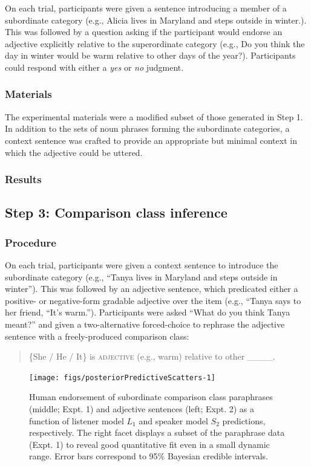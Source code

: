 \documentclass[doc]{apa6}
\begin{document}
On each trial, participants were given a sentence introducing a member of a subordinate category (e.g., Alicia lives in Maryland and steps outside in winter.). 
This was followed by a question asking if the participant would endorse an adjective explicitly relative to the superordinate category (e.g., Do you think the day in winter would be warm relative to other days of the year?).
Participants could respond with either a \emph{yes} or \emph{no} judgment.

\subsubsection{Materials}

The experimental materials were a modified subset of those generated in Step 1. 
In addition to the sets of noun phrases forming the subordinate categories, a context sentence was crafted to provide an appropriate but minimal context in which the adjective could be uttered. 

\subsubsection{Results}

\subsection{Step 3: Comparison class inference}

\subsubsection{Procedure}

On each trial, participants were given a context sentence to introduce
the subordinate category (e.g., ``Tanya lives in Maryland and
steps outside in winter''). This was followed by an adjective sentence,
which predicated either a positive- or negative-form gradable adjective
over the item (e.g., ``Tanya says to her friend, ``It's
warm.''). Participants were asked ``What do you think Tanya
meant?'' and given a two-alternative forced-choice to rephrase the
adjective sentence with a freely-produced comparison class:

\begin{quote}
\{She / He / It\} is \textsc{adjective} (e.g., warm) relative to other \_\_\_\_.
\end{quote}

\begin{figure}[htb]

{\centering \texttt{[image: figs/posteriorPredictiveScatters-1]} 

}

\caption{Human endorsement of subordinate comparison class paraphrases (middle; Expt. 1) and adjective sentences (left; Expt. 2) as a function of listener model $L_1$ and speaker model $S_2$ predictions, respectively. The right facet displays a subset of the paraphrase data (Expt. 1) to reveal good quantitative fit even in a small dynamic range. Error bars correspond to 95\% Bayesian credible intervals.}\label{fig:posteriorPredictiveScatters}
\end{figure}
\end{document}
